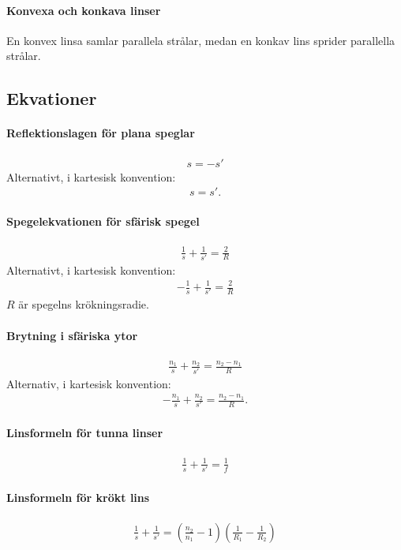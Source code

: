 \paragraph{Konvexa och konkava linser}
En konvex linsa samlar parallela strålar, medan en konkav lins sprider parallella strålar.

\subsection{Ekvationer}

\paragraph{Reflektionslagen för plana speglar}
\begin{align*}
	s = -s'
\end{align*}
Alternativt, i kartesisk konvention:
\begin{align*}
	s = s'.
\end{align*}

\paragraph{Spegelekvationen för sfärisk spegel}
\begin{align*}
	\frac{1}{s} + \frac{1}{s'} = \frac{2}{R}
\end{align*}
Alternativt, i kartesisk konvention:
\begin{align*}
	-\frac{1}{s} + \frac{1}{s'} = \frac{2}{R}
\end{align*}
$R$ är spegelns krökningsradie.

\deriv

\paragraph{Brytning i sfäriska ytor}
\begin{align*}
	\frac{n_1}{s} + \frac{n_2}{s'} = \frac{n_2 - n_1}{R}
\end{align*}
Alternativ, i kartesisk konvention:
\begin{align*}
	-\frac{n_1}{s} + \frac{n_2}{s'} = \frac{n_2 - n_1}{R}.
\end{align*}

\deriv

\paragraph{Linsformeln för tunna linser}
\begin{align*}
	\frac{1}{s} + \frac{1}{s'} = \frac{1}{f}
\end{align*}

\deriv

\paragraph{Linsformeln för krökt lins}
\begin{align*}
	\frac{1}{s} + \frac{1}{s'} = \left(\frac{n_2}{n_1} - 1\right)\left(\frac{1}{R_1} - \frac{1}{R_2}\right)
\end{align*}